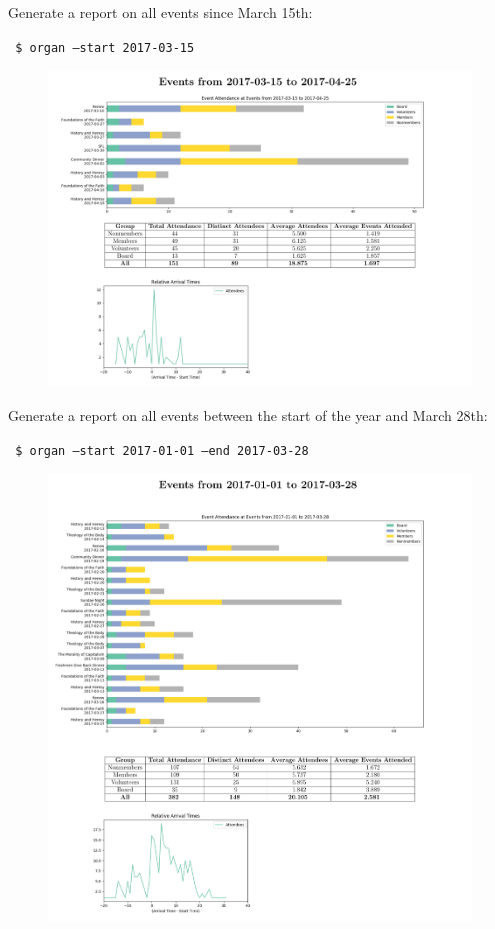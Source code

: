 \documentclass[12pt]{article}
\begin{document}
Generate a report on all events since March 15th:

\texttt{ \$ organ --start 2017-03-15}
\begin{figure}[H]
    \centering
    \includegraphics[width=5.3in]{./media/start.pdf}
\end{figure}
\pagebreak

Generate a report on all events between the start of the year and March 28th:

\texttt{ \$ organ --start 2017-01-01 --end 2017-03-28}
\begin{figure}[H]
    \centering
    \includegraphics[width=5.3in]{./media/range.pdf}
\end{figure}
\pagebreak
\end{document}
